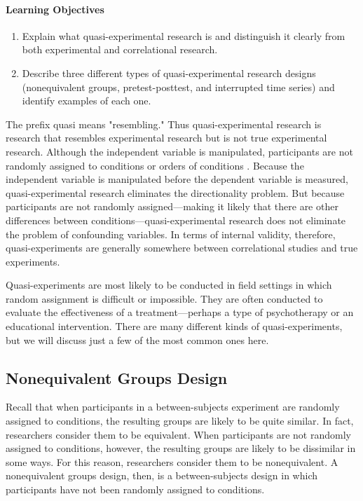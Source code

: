 \paragraph{Learning Objectives}
 \begin{enumerate}
 \item Explain what quasi-experimental research is and distinguish it clearly from both experimental and correlational research.
 \item Describe three different types of quasi-experimental research designs (nonequivalent groups, pretest-posttest, and interrupted time series) and identify examples of each one.
   \end{enumerate}


The prefix quasi means "resembling." Thus quasi-experimental research is research that resembles experimental research but is not true experimental research. Although the independent variable is manipulated, participants are not randomly assigned to conditions or orders of conditions \citep{cook_quasi-experimentation:_1979}. Because the independent variable is manipulated before the dependent variable is measured, quasi-experimental research eliminates the directionality problem. But because participants are not randomly assigned---making it likely that there are other differences between conditions---quasi-experimental research does not eliminate the problem of confounding variables. In terms of internal validity, therefore, quasi-experiments are generally somewhere between correlational studies and true experiments.

Quasi-experiments are most likely to be conducted in field settings in which random assignment is difficult or impossible. They are often conducted to evaluate the effectiveness of a treatment---perhaps a type of psychotherapy or an educational intervention. There are many different kinds of quasi-experiments, but we will discuss just a few of the most common ones here.

\subsection{Nonequivalent Groups Design}

Recall that when participants in a between-subjects experiment are randomly assigned to conditions, the resulting groups are likely to be quite similar. In fact, researchers consider them to be equivalent. When participants are not randomly assigned to conditions, however, the resulting groups are likely to be dissimilar in some ways. For this reason, researchers consider them to be nonequivalent. A nonequivalent groups design, then, is a between-subjects design in which participants have not been randomly assigned to conditions.

